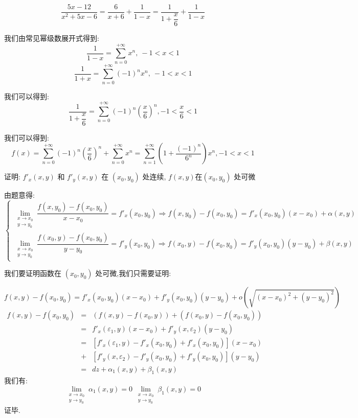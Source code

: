 \begin{solution}
	$$\frac{5x-12}{x^2+5x-6}=\frac{6}{x+6}+\frac{1}{1-x}=\dfrac{1}{1+\dfrac{x}{6}}+\frac{1}{1-x}$$
	
	我们由常见幂级数展开式得到: 
	$$\frac{1}{1-x}=\sum\limits_{n=0}^{+\infty}x^{n},\ -1<x<1$$
	$$\frac{1}{1+x}=\sum\limits_{n=0}^{+\infty}(-1)^{n}x^{n},\ -1<x<1$$
	
	我们可以得到: 
	$$\dfrac{1}{1+\dfrac{x}{6}}=\sum\limits_{n=0}^{+\infty}(-1)^{n}(\frac{x}{6})^{n},-1<\frac{x}{6}<1$$
	
	我们可以得到: 
	$$f(x)=\sum\limits_{n=0}^{+\infty}(-1)^{n}(\frac{x}{6})^{n}+\sum\limits_{n=0}^{+\infty}x^{n}=\sum\limits_{n=1}^{+\infty}(1+\frac{(-1)^n}{6^n})x^n,-1<x<1$$
	
\end{solution}

\begin{example}[][Exam: 30.2.14]
	证明: $f'_{x}(x,y)$ 和 $f'_{y}(x,y)$ 在 $(x_{0},y_{0})$ 处连续, $f(x,y)$在$(x_{0},y_{0})$ 处可微
\end{example}

\begin{solution}
	
	由题意得: 
	$$\left\lbrace 
	\begin{array}{l}
		\lim\limits_{\substack{x\to x_{0}\\ y\to y_{0}}}\dfrac{f(x,y_{0})-f(x_{0},y_{0})}{x-x_{0}}=f'_{x}(x_{0},y_{0})\Rightarrow f(x,y_{0})-f(x_{0},y_{0})=f'_{x}(x_{0},y_{0})(x-x_{0})+\alpha(x,y)\\
		\lim\limits_{\substack{x\to x_{0}\\ y\to y_{0}}}\dfrac{f(x_{0},y)-f(x_{0},y_{0})}{y-y_{0}}=f'_{y}(x_{0},y_{0})\Rightarrow f(x_{0},y)-f(x_{0},y_{0})=f'_{y}(x_{0},y_{0})(y-y_{0})+\beta(x,y)
	\end{array}
	\right.$$
	
	我们要证明函数在 $(x_{0},y_{0})$ 处可微,我们只需要证明: 
	
	$$f(x,y)-f(x_{0},y_{0})=f'_{x}(x_{0},y_{0})(x-x_{0})+f'_{y}(x_{0},y_{0})(y-y_{0})+o(\sqrt{(x-x_{0})^2+(y-y_{0})^2})$$
	\begin{eqnarray*}
		f(x,y)-f(x_{0},y_{0})&=&(f(x,y)-f(x_{0},y))+(f(x_{0},y)-f(x_{0},y_{0}))\\
		&=&f'_{x}(\varepsilon_{1},y)(x-x_{0})+f'_{y}(x,\varepsilon_{2})(y-y_{0})\\
		&=&\left[f'_{x}(\varepsilon_{1},y)-f'_{x}(x_{0},y_{0})+f'_{x}(x_{0},y_{0}) \right](x-x_{0})\\ &+&\left[f'_{y}(x,\varepsilon_{2})-f'_{y}(x_{0},y_{0})+f'_{y}(x_{0},y_{0}) \right](y-y_{0})\\
		&=&dz+\alpha_{1}(x,y)+\beta_{1}(x,y)
	\end{eqnarray*}
	我们有: 
	$$\lim\limits_{\substack{x\to x_{0}\\ y\to y_{0}}}\alpha_{1}(x,y)=0\ \lim\limits_{\substack{x\to x_{0}\\ y\to y_{0}}}\beta_{1}(x,y)=0$$
	证毕.
\end{solution}

